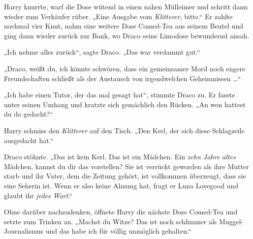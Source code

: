 Harry knurrte, warf die Dose wütend in einen nahen Mülleimer und schritt dann wieder zum Verkäufer rüber.
„Eine Ausgabe vom \emph{Klitterer}, bitte.“ Er zahlte nochmal vier Knut, nahm eine weitere Dose Comed-Tea aus seinem Beutel und ging dann wieder zurück zur Bank, wo Draco seine Limodose bewundernd ansah.

„Ich nehme alles zurück“, sagte Draco.
„Das war verdammt gut.“

„Draco, weißt du, ich könnte schwören, dass ein gemeinsamer Mord noch engere Freundschaften schließt als der Austausch von irgendwelchen Geheimnissen …“

„Ich habe einen Tutor, der das mal gesagt hat“, stimmte Draco zu. Er fasste unter seinen Umhang und kratzte sich gemächlich den Rücken.
„An wen hattest du da gedacht?“

Harry schmiss den \emph{Klitterer} auf den Tisch.
„Den Kerl, der sich diese Schlagzeile ausgedacht hat.“

Draco stöhnte.
„Das ist kein Kerl. Das ist ein Mädchen. Ein \emph{zehn Jahre altes} Mädchen, kannst du dir das vorstellen? Sie ist verrückt geworden als ihre Mutter starb und ihr Vater, dem die Zeitung gehört, ist vollkommen überzeugt, dass sie eine Seherin ist. Wenn er also keine Ahnung hat, fragt er Luna Lovegood und glaubt ihr \emph{jedes Wort}.“

Ohne darüber nachzudenken, öffnete Harry die nächste Dose Comed-Tea und setzte zum Trinken an.
„Machst du Witze? Das ist noch schlimmer als Muggel-Journalismus und das habe ich für völlig unmöglich gehalten.“


